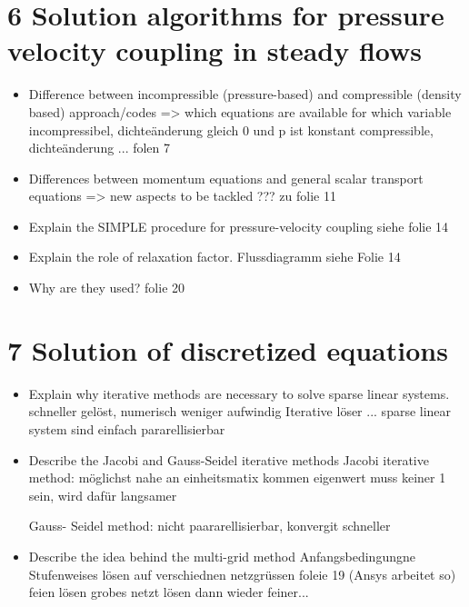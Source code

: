 \documentclass[a4paper]{scrartcl}
\begin{document}
\section{6 Solution algorithms for pressure velocity coupling in steady flows}
\begin{itemize} 

\item Difference between incompressible (pressure-based) and compressible (density based) approach/codes => which equations are available for which variable
incompressibel, dichteänderung gleich 0 und p ist konstant
compressible, dichteänderung ...
folen 7


\item Differences between momentum equations and general scalar transport equations => new aspects to be tackled
??? zu folie 11

\item Explain the SIMPLE procedure for pressure-velocity coupling
siehe folie 14

\item Explain the role of relaxation factor. 
Flussdiagramm siehe Folie 14


\item Why are they used?
folie 20


\end{itemize}



\section{7 Solution of discretized equations}
\begin{itemize}
\item Explain why iterative methods are necessary to solve sparse linear systems.
schneller gelöst, numerisch weniger aufwindig
Iterative löser ...
sparse linear system sind einfach pararellisierbar


\item Describe the Jacobi and Gauss-Seidel iterative methods
Jacobi iterative method: 
möglichst nahe an einheitsmatix kommen
eigenwert muss keiner 1 sein, wird dafür langsamer 

Gauss- Seidel method: 
nicht paararellisierbar, konvergit schneller

\item Describe the idea behind the multi-grid method
Anfangsbedingungne 
Stufenweises lösen auf verschiednen netzgrüssen
foleie 19 (Ansys arbeitet so)
feien lösen
grobes netzt lösen
dann wieder feiner...

\end{itemize}
\end{document}
